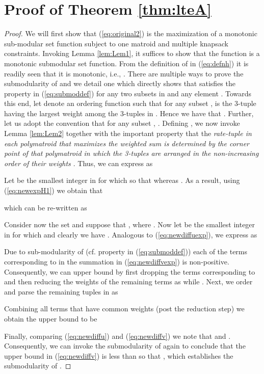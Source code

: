 \documentclass[11pt] {article}
\begin{document}
\section{Proof of Theorem \ref{thm:lteA}}\label{app:lteA}
\begin{proof} We will first show that (\ref{eq:original2}) is the maximization of a monotonic sub-modular set function subject to one matroid and multiple knapsack constraints. Invoking Lemma \ref{lem:Lem1}, it suffices to show that the function  is a monotonic submodular set function. From the definition of  in (\ref{eq:defnh}) it is readily seen that it is monotonic, i.e., . There are multiple ways to prove the submodularity of  and we detail one which directly shows that  satisfies  the property in (\ref{eq:submoddef}) for any two subsets  in  and any
 element . Towards this end,
let  denote an ordering function such that for any
 subset ,  is the 3-tuple having the  largest weight among the 3-tuples in . Hence we have that . Further, let us adopt the convention that for any subset ,
  . Defining ,
    we now invoke Lemma \ref{lem:Lem2} together with the important property that the {\em rate-tuple in each polymatroid that maximizes the weighted sum is determined by the corner point of that polymatroid in which the 3-tuples are arranged in the non-increasing order of their weights \cite{edmonds:poly,tse:poly}}. Thus, we can express  as

 Let  be the smallest integer in  for which  so that  whereas
   .
As a result, using (\ref{eq:newexpH1}) we obtain that
 
which can be re-written as
 
Consider now the set  and suppose that , where .
Now let  be the smallest integer in  for which  and clearly we have .
 Analogous to (\ref{eq:newdiffuexp}), we  express   as
  
Due to sub-modularity of  (cf. property in (\ref{eq:submoddef})) each of the terms corresponding to  in the summation in (\ref{eq:newdiffvexp}) is non-positive. Consequently, we can upper bound
  by first dropping the terms corresponding to  and then reducing the weights of the remaining terms as
   while .
 Next, we order and parse the remaining tuples in  as
 
Combining all terms that have common weights (post the reduction step) we obtain the upper bound to be

Finally, comparing (\ref{eq:newdiffu}) and (\ref{eq:newdiffv}) we note that  and . Consequently,
we can invoke the submodularity of  again to conclude that the upper bound in (\ref{eq:newdiffv}) is less than  so that , which establishes the submodularity of .





\end{proof}
\end{document}
